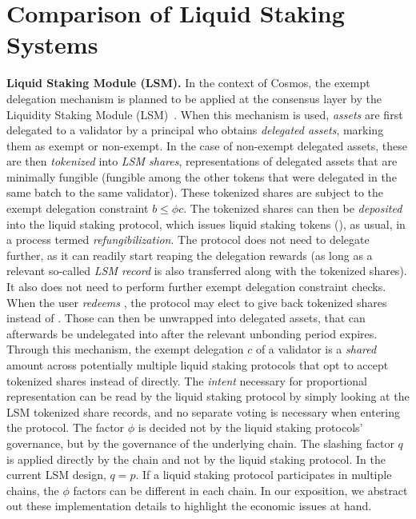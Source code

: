 \section{Comparison of Liquid Staking Systems}

\noindent
\textbf{Liquid Staking Module (LSM).}
In the context
of Cosmos, the exempt delegation mechanism is planned to be applied at the consensus
layer by the Liquidity Staking Module (LSM)~\cite{liquidity-staking-module}.
When this mechanism is used, \emph{assets} are first delegated to a validator by
a principal who obtains \emph{delegated assets}, marking them as exempt or non-exempt.
In the case of non-exempt delegated assets, these are then
\emph{tokenized} into \emph{LSM shares}, representations of delegated assets that
are minimally fungible (fungible among the other tokens that were delegated in the
same batch to the same validator). These tokenized
shares are subject to the exempt delegation constraint $b \leq \phi c$. The tokenized shares
can then be \emph{deposited} into the liquid staking protocol, which issues liquid staking
tokens (\stassets), as usual, in a process termed \emph{refungibilization}.
The protocol does not need to delegate further, as it can readily start reaping the
delegation rewards (as long as a relevant so-called \emph{LSM record} is also transferred
along with the tokenized shares).
It also does not need to perform further exempt delegation constraint checks.
When the user \emph{redeems} \stassets, the protocol may elect to give
back tokenized shares instead of \assets. Those can then be unwrapped into delegated assets,
that can afterwards be undelegated into \assets after the relevant unbonding
period expires.
Through this mechanism, the exempt delegation $c$ of a validator is
a \emph{shared} amount across potentially multiple liquid staking
protocols that opt to accept tokenized shares
instead of \assets directly. The \emph{intent} necessary for proportional
representation can be read by the liquid staking protocol by simply
looking at the LSM tokenized share records, and no separate voting is
necessary when entering the protocol. The factor $\phi$ is decided not by the
liquid staking protocols' governance, but by the governance of
the underlying chain. The slashing factor $q$ is applied directly
by the chain and not by the liquid staking protocol.
In the current LSM design, $q = p$.
If a liquid staking protocol participates in
multiple chains, the $\phi$ factors can be different in each chain.
In our exposition, we abstract out these implementation details to highlight
the economic issues at hand.

